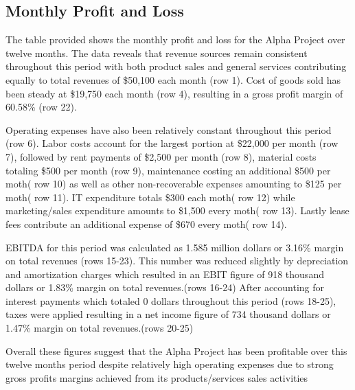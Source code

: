 

\subsection{Monthly Profit and Loss}\label{sec:title}

The table provided shows the monthly profit and loss for the Alpha Project over twelve months. The data reveals that revenue sources remain consistent throughout this period with both product sales and general services contributing equally to total revenues of \$50,100 each month (row 1). Cost of goods sold has been steady at \$19,750 each month (row 4), resulting in a gross profit margin of 60.58\% (row 22). 

Operating expenses have also been relatively constant throughout this period (row 6). Labor costs account for the largest portion at \$22,000 per month (row 7), followed by rent payments of \$2,500 per month (row 8), material costs totaling \$500 per month (row 9), maintenance costing an additional \$500 per moth( row 10) as well as other non-recoverable expenses amounting to \$125 per moth( row 11). IT expenditure totals \$300 each moth( row 12) while marketing/sales expenditure amounts to \$1,500 every moth( row 13). Lastly lease fees contribute an additional expense of \$670 every moth( row 14). 

EBITDA for this period was calculated as 1.585 million dollars or 3.16\% margin on total revenues (rows 15-23). This number was reduced slightly by depreciation and amortization charges which resulted in an EBIT figure of 918 thousand dollars or 1.83\% margin on total revenues.(rows 16-24) After accounting for interest payments which totaled 0 dollars throughout this period (rows 18-25), taxes were applied resulting in a net income figure of 734 thousand dollars or 1.47\% margin on total revenues.(rows 20-25) 

Overall these figures suggest that the Alpha Project has been profitable over this twelve months period despite relatively high operating expenses due to strong gross profits margins achieved from its products/services sales activities